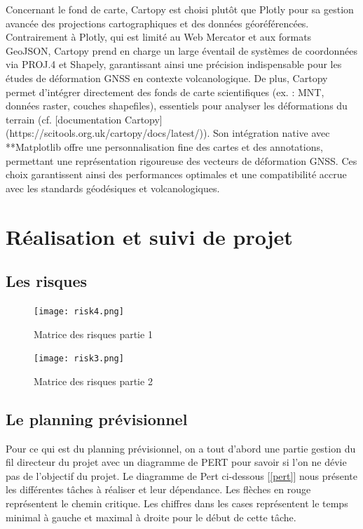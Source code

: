 \documentclass[11pt]{article}
\begin{document}
Concernant le fond de carte, Cartopy est choisi plutôt que Plotly pour sa gestion avancée des projections cartographiques et des données géoréférencées. Contrairement à Plotly, qui est limité au Web Mercator et aux formats GeoJSON, Cartopy prend en charge un large éventail de systèmes de coordonnées via PROJ.4 et Shapely, garantissant ainsi une précision indispensable pour les études de déformation GNSS en contexte volcanologique. De plus, Cartopy permet d’intégrer directement des fonds de carte scientifiques (ex. : MNT, données raster, couches shapefiles), essentiels pour analyser les déformations du terrain (cf. [documentation Cartopy](https://scitools.org.uk/cartopy/docs/latest/)). Son intégration native avec **Matplotlib offre une personnalisation fine des cartes et des annotations, permettant une représentation rigoureuse des vecteurs de déformation GNSS. Ces choix garantissent ainsi des performances optimales et une compatibilité accrue avec les standards géodésiques et volcanologiques.
\section{Réalisation et suivi de projet}

\subsection{Les risques}

\begin{figure}[h!]
    \centering 
    \texttt{[image: risk4.png]} 
    \caption{Matrice des risques partie 1} 
\end{figure}

\begin{figure}[h!]
    \centering 
    \texttt{[image: risk3.png]} 
    \caption{Matrice des risques partie 2} 
\end{figure}

\newpage


\subsection{Le planning prévisionnel}

Pour ce qui est du planning prévisionnel, on a tout d'abord une partie gestion du fil directeur du projet avec un diagramme de PERT pour savoir si l'on ne dévie pas de l'objectif du projet. Le diagramme de Pert ci-dessous [\ref{pert}] nous présente les différentes tâches à réaliser et leur dépendance. Les flèches en rouge représentent le chemin critique. Les chiffres dans les cases représentent le temps minimal à gauche et maximal à droite pour le début de cette tâche. 
\end{document}
